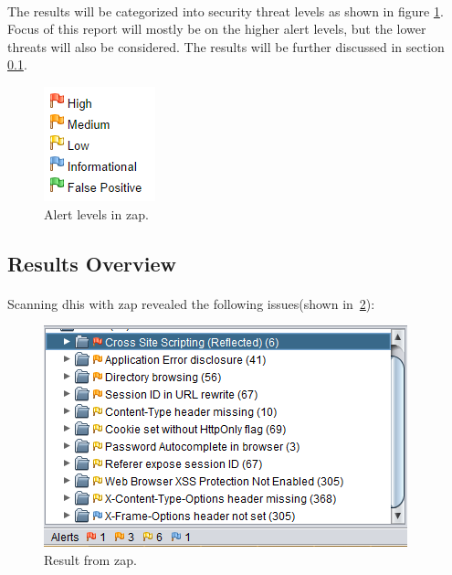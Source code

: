 \documentclass[11pt,english,a4paper]{report}
\begin{document}
\paragraph{}
The results will be categorized into security threat levels as shown in figure \ref{fig:zapalerts}.
Focus of this report will mostly be on the higher alert levels, but the lower threats will also be considered.
The results will be further discussed in section \ref{sec:zapresult-overview}.

\begin{figure}[h]
    \centering
    \includegraphics[scale=0.65]{images/alerts.png}
    \caption{Alert levels in \gls{zap}.}
    \label{fig:zapalerts}
\end{figure}


\subsection{Results Overview}
\label{sec:zapresult-overview}
\paragraph{}
Scanning \gls{dhis} with \gls{zap} revealed the following issues(shown in~\ref{fig:zapresults}):

\begin{figure}[h]
    \centering
    \includegraphics[scale=0.65]{images/zap-result.png}
    \caption{Result from \gls{zap}.}
    \label{fig:zapresults}
\end{figure}
\end{document}
